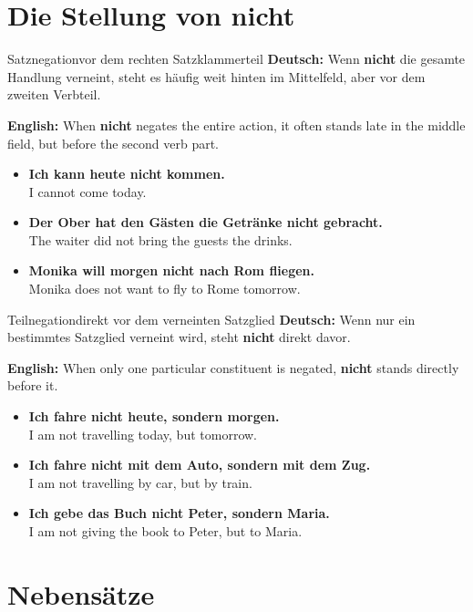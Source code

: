 \documentclass[a4paper,11pt]{article}
\newcommand{\GermanText}[1]{\textbf{Deutsch: }#1\par}
\newcommand{\EnglishText}[1]{{\small\color{SoftGray}\textbf{English: }#1\par}}
\newcommand{\ExampleItem}[2]{\item \textbf{#1}\\{\small\color{SoftGray}#2}}
\begin{document}
    
    \section{Die Stellung von \glqq nicht\grqq}
        
        \begin{grammarentry}{Satznegation}{vor dem rechten Satzklammerteil}
            \GermanText{Wenn \textbf{nicht} die gesamte Handlung verneint, steht es häufig weit hinten im Mittelfeld, aber vor dem zweiten Verbteil.}
            \EnglishText{When \textbf{nicht} negates the entire action, it often stands late in the middle field, but before the second verb part.}
        \end{grammarentry}
        
        \begin{exbox}
            \begin{itemize}
                \ExampleItem{Ich kann heute nicht kommen.}{I cannot come today.}
                \ExampleItem{Der Ober hat den Gästen die Getränke nicht gebracht.}{The waiter did not bring the guests the drinks.}
                \ExampleItem{Monika will morgen nicht nach Rom fliegen.}{Monika does not want to fly to Rome tomorrow.}
            \end{itemize}
        \end{exbox}
        
        \begin{grammarentry}{Teilnegation}{direkt vor dem verneinten Satzglied}
            \GermanText{Wenn nur ein bestimmtes Satzglied verneint wird, steht \textbf{nicht} direkt davor.}
            \EnglishText{When only one particular constituent is negated, \textbf{nicht} stands directly before it.}
        \end{grammarentry}
        
        \begin{exbox}
            \begin{itemize}
                \ExampleItem{Ich fahre nicht heute, sondern morgen.}{I am not travelling today, but tomorrow.}
                \ExampleItem{Ich fahre nicht mit dem Auto, sondern mit dem Zug.}{I am not travelling by car, but by train.}
                \ExampleItem{Ich gebe das Buch nicht Peter, sondern Maria.}{I am not giving the book to Peter, but to Maria.}
            \end{itemize}
        \end{exbox}
    
    
    \section{Nebensätze}
        
\end{document}
